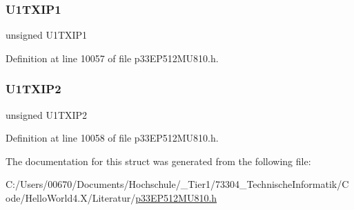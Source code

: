 \subsubsection{\texorpdfstring{U1\+T\+X\+I\+P1}{U1TXIP1}}
{\footnotesize\ttfamily unsigned U1\+T\+X\+I\+P1}



Definition at line 10057 of file p33\+E\+P512\+M\+U810.\+h.

\mbox{\label{structtag_i_p_c3_b_i_t_s_ab29db95219cd6228fedadbc956a17e2b}} 
\subsubsection{\texorpdfstring{U1\+T\+X\+I\+P2}{U1TXIP2}}
{\footnotesize\ttfamily unsigned U1\+T\+X\+I\+P2}



Definition at line 10058 of file p33\+E\+P512\+M\+U810.\+h.



The documentation for this struct was generated from the following file\+:\begin{DoxyCompactItemize}
\item 
C\+:/\+Users/00670/\+Documents/\+Hochschule/\+\_\+\+Tier1/73304\+\_\+\+Technische\+Informatik/\+Code/\+Hello\+World4.\+X/\+Literatur/\hyperlink{p33_e_p512_m_u810_8h}{p33\+E\+P512\+M\+U810.\+h}\end{DoxyCompactItemize}
